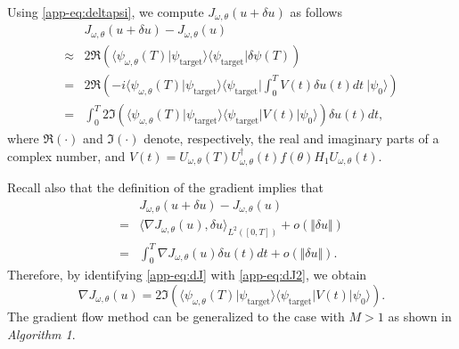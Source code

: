 \documentclass[letterpaper, 10 pt, conference]{ieeeconf}
\begin{document}
Using \eqref{app-eq:deltapsi}, we compute $J_{\omega,\theta}(u+\delta u)$ as follows
\begin{eqnarray}
&J_{\omega,\theta}(u+\delta u)-J_{\omega,\theta}(u)\nonumber\ \ \ \ \ \  \  \ \ \ \ \ \ \ \ \ \ \ \ \ \ \ \ \ \ \ \ \ \ \ \\\approx&2\Re\left(\langle\psi_{\omega,\theta}(T)\vert\psi_{\textrm{target}}\rangle\langle\psi_{\textrm{target}}\vert\delta\psi(T)\right)\nonumber \ \ \ \ \  \ \ \  \ \ \  \ \ \ \ \ \ \ \ \\
=&2\Re\left(-i\langle\psi_{\omega,\theta}(T)\vert\psi_{\textrm{target}}\rangle\langle\psi_{\textrm{target}}\vert \int_0^TV(t) \delta u(t)dt~ \vert\psi_0\rangle\right)\nonumber\\
=&\int_0^T2\Im\left(\langle\psi_{\omega,\theta}(T)\vert\psi_{\textrm{target}}\rangle\langle\psi_{\textrm{target}}\vert V(t)\vert\psi_0\rangle\right)\delta u(t)dt,  \ \ \ \label{app-eq:dJ}
\end{eqnarray}where $\Re(\cdot)$ and $\Im(\cdot)$ denote, respectively, the real and imaginary parts of a complex number, and $V(t)=U_{\omega,\theta}(T)U_{\omega,\theta}^\dagger(t)f(\theta)H_1U_{\omega,\theta}(t)$.

Recall also that the definition of the gradient implies that
\begin{eqnarray}
&J_{\omega,\theta}(u+\delta u)-J_{\omega,\theta}(u)\nonumber\ \ \ \ \ \ \ \ \ \ \  \  \\
=&\langle \nabla J_{\omega,\theta}(u),\delta u\rangle_{L^2([0,T])}+o(\Vert\delta u\Vert)\nonumber\\
=&\int_0^T \nabla J_{\omega,\theta}(u)\delta u(t)dt+o(\Vert\delta u\Vert).\label{app-eq:dJ2}
\end{eqnarray}Therefore, by identifying \eqref{app-eq:dJ} with \eqref{app-eq:dJ2}, we obtain
\begin{equation}\label{app-eq:gradJ}
 \nabla J_{\omega,\theta}(u)=2\Im\left(\langle\psi_{\omega,\theta}(T)\vert\psi_{\textrm{target}}\rangle\langle\psi_{\textrm{target}}\vert V(t)\vert\psi_0\rangle\right).
\end{equation}
The
gradient flow method can be generalized to the case with $M>1$ as
shown in \emph{Algorithm 1}.
\end{document}
